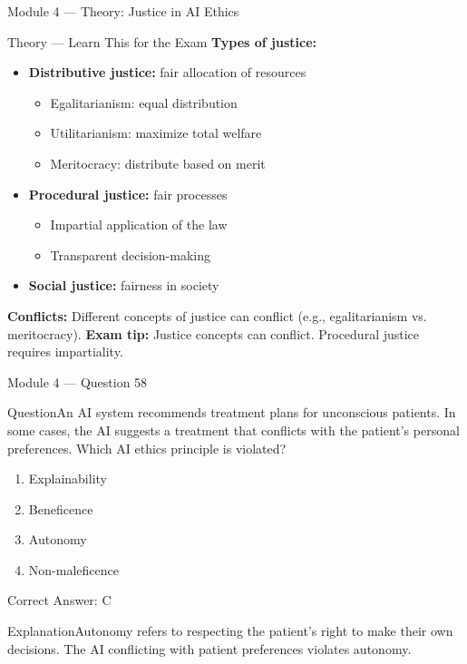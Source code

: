 \documentclass[aspectratio=169,10pt]{beamer}
\newcommand{\question}[1]{\begin{block}{Question}#1\end{block}}
\newcommand{\options}[4]{%
	\begin{enumerate}[label=\Alph*.,leftmargin=*]
		\item #1
		\item #2
		\item #3
		\item #4
	\end{enumerate}
}
\newcommand{\answerbox}[1]{\begin{exampleblock}{Correct Answer: #1}\end{exampleblock}}
\newcommand{\explain}[1]{\begin{block}{Explanation}#1\end{block}}
\newcommand{\theory}[1]{%
	\begin{block}{Theory --- Learn This for the Exam}
		\small #1
	\end{block}
}
\begin{document}
	\begin{frame}{Module 4 --- Theory: Justice in AI Ethics}
		\theory{
			\textbf{Types of justice:}
			\begin{itemize}
				\item \textbf{Distributive justice:} fair allocation of resources
				\begin{itemize}
					\item Egalitarianism: equal distribution
					\item Utilitarianism: maximize total welfare
					\item Meritocracy: distribute based on merit
				\end{itemize}
				\item \textbf{Procedural justice:} fair processes
				\begin{itemize}
					\item Impartial application of the law
					\item Transparent decision-making
				\end{itemize}
				\item \textbf{Social justice:} fairness in society
			\end{itemize}
			\textbf{Conflicts:} Different concepts of justice can conflict (e.g., egalitarianism vs. meritocracy).
			\textbf{Exam tip:} Justice concepts can conflict. Procedural justice requires impartiality.
		}
	\end{frame}
	
	\begin{frame}{Module 4 --- Question 58}
		\question{An AI system recommends treatment plans for unconscious patients. In some cases, the AI suggests a treatment that conflicts with the patient's personal preferences. Which AI ethics principle is violated?}
		\options{Explainability}{Beneficence}{Autonomy}{Non-maleficence}
		\answerbox{C}
		\explain{Autonomy refers to respecting the patient's right to make their own decisions. The AI conflicting with patient preferences violates autonomy.}
	\end{frame}
	
\end{document}
